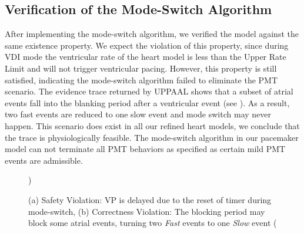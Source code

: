 \subsection{Verification of the Mode-Switch Algorithm}
After implementing the mode-switch algorithm, we verified the model against the same existence property. We expect the violation of this property, since during VDI mode the ventricular rate of the heart model is less than the Upper Rate Limit and will not trigger ventricular pacing. However, this property is still satisfied, indicating the mode-switch algorithm failed to eliminate the PMT scenario. The evidence trace returned by UPPAAL shows that a subset of atrial events fall into the blanking period after a ventricular event (see ). As a result, two fast events are reduced to one slow event and mode switch may never happen. This scenario does exist in all our refined heart models, we conclude that the trace is physiologically feasible. The mode-switch algorithm in our pacemaker model can not terminate all PMT behaviors as specified as certain mild PMT events are admissible.
\begin{figure}
\centering
		\vspace{-10pt}
	\caption{(a) Safety Violation: VP is delayed due to the reset of timer during mode-switch, (b) Correctness Violation: The blocking period may block some atrial events, turning two \emph{Fast} events to one \emph{Slow} event (\cite{TACAS12}})
\vspace{-20pt}
\end{figure} 

